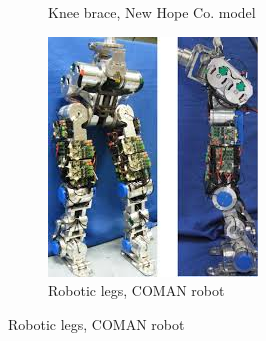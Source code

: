 \begin{figure}[h]
\begin{subfigure}[b]{0.3\textwidth}
        \caption{Knee brace, New Hope Co. model}
        \label{fig:orthotic_leg}
    \end{subfigure}
    \centering
    \begin{subfigure}[b]{0.3\textwidth}
        \includegraphics[width=\textwidth]{figures/robotic_leg.jpg}
        \caption{Robotic legs, COMAN robot \cite{coman}}
        \label{fig:robotic_leg}
    \end{subfigure}
\end{figure}



